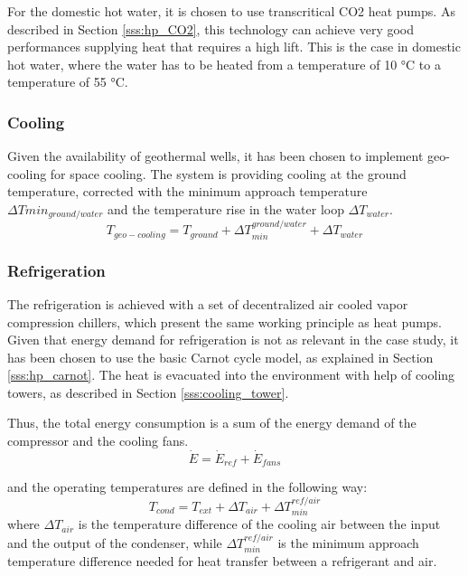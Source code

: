 \documentclass{article}
\begin{document}
For the domestic hot water, it is chosen to use transcritical CO2 heat pumps. As described in Section \ref{sss:hp_CO2}, this technology can achieve very good performances supplying heat that requires a high lift. This is the case in domestic hot water, where the water has to be heated from a temperature of 10 \si{\celsius} to a temperature of 55 \si{\celsius}.

\subsubsection{Cooling}
Given the availability of geothermal wells, it has been chosen to implement geo-cooling for space cooling. The system is providing cooling at the ground temperature, corrected with the minimum approach temperature $\Delta Tmin_{ground/water}$ and the temperature rise in the water loop $\Delta T_{water}$.
\begin{equation}
T_{geo-cooling} = T_{ground} + \Delta T_{min}^{ground/water} + \Delta T_{water}
\end{equation}

\subsubsection{Refrigeration}
The refrigeration is achieved with a set of decentralized air cooled vapor compression chillers, which present the same working principle as heat pumps. Given that energy demand for refrigeration is not as relevant in the case study, it has been chosen to use the basic Carnot cycle model, as explained in Section \ref{sss:hp_carnot}. The heat is evacuated into the environment with help of cooling towers, as described in Section \ref{sss:cooling_tower}.

Thus, the total energy consumption is a sum of the energy demand of the compressor and the cooling fans.
\begin{equation}
\dot{E} = \dot{E}_{ref} + \dot{E}_{fans}
\end{equation}

and the operating temperatures are defined in the following way:
\begin{equation}
T_{cond} = T_{ext} + \Delta T_{air} + \Delta T_{min}^{ref/air}
\end{equation}
where $\Delta T_{air}$ is the temperature difference of the cooling air between the input and the output of the condenser, while $\Delta T_{min}^{ref/air}$ is the minimum approach temperature difference needed for heat transfer between a refrigerant and air.\\
\end{document}
